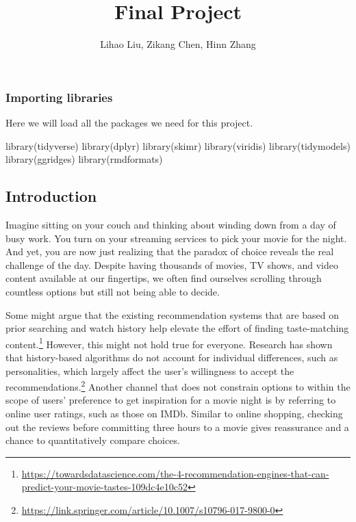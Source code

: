 \documentclass[
]{article}
\title{Final Project}
\author{Lihao Liu, Zikang Chen, Hinn Zhang}
\date{}
\newenvironment{Shaded}{\begin{snugshade}}{\end{snugshade}}
\newcommand{\FunctionTok}[1]{\textcolor[rgb]{0.00,0.00,0.00}{#1}}
\newcommand{\NormalTok}[1]{#1}
\begin{document}
\maketitle

{
\setcounter{tocdepth}{2}
\tableofcontents
}
\hypertarget{importing-libraries}{%
\subsubsection{Importing libraries}\label{importing-libraries}}

Here we will load all the packages we need for this project.

\begin{Shaded}
\begin{Highlighting}[]
\FunctionTok{library}\NormalTok{(tidyverse)}
\FunctionTok{library}\NormalTok{(dplyr)}
\FunctionTok{library}\NormalTok{(skimr)}
\FunctionTok{library}\NormalTok{(viridis)}
\FunctionTok{library}\NormalTok{(tidymodels)}
\FunctionTok{library}\NormalTok{(ggridges)}
\FunctionTok{library}\NormalTok{(rmdformats)}
\end{Highlighting}
\end{Shaded}

\hypertarget{introduction}{%
\subsection{Introduction}\label{introduction}}

Imagine sitting on your couch and thinking about winding down from a day
of busy work. You turn on your streaming services to pick your movie for
the night. And yet, you are now just realizing that the paradox of
choice reveals the real challenge of the day. Despite having thousands
of movies, TV shows, and video content available at our fingertips, we
often find ourselves scrolling through countless options but still not
being able to decide.

Some might argue that the existing recommendation systems that are based
on prior searching and watch history help elevate the effort of finding
taste-matching content.\footnote{\url{https://towardsdatascience.com/the-4-recommendation-engines-that-can-predict-your-movie-tastes-109dc4e10c52}}
However, this might not hold true for everyone. Research has shown that
history-based algorithms do not account for individual differences, such
as personalities, which largely affect the user's willingness to accept
the recommendations.\footnote{\url{https://link.springer.com/article/10.1007/s10796-017-9800-0}}
Another channel that does not constrain options to within the scope of
users' preference to get inspiration for a movie night is by referring
to online user ratings, such as those on IMDb. Similar to online
shopping, checking out the reviews before committing three hours to a
movie gives reassurance and a chance to quantitatively compare choices.
\end{document}
